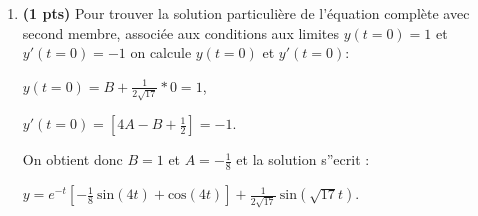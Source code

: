 \documentclass[fleqn]{article}
\begin{document}
\begin{enumerate}
{Par identification des termes en $\text{sin}(\sqrt{17} t)$ et ceux en $\text{cos}(\sqrt{17} t)$ de part et d'autre de l'\'egalit\'e, on obtient :}

\begin{center}
{$D=0$ et $C=\frac{1}{2\sqrt{17}}$.}
\end{center}

{Soit une solution particuli\`ere de l'\'equation avec second membre \'egale \`a:}

\begin{center}
{$y= \frac{1}{2\sqrt{17}}\ \text{sin}(\sqrt{17} t)$,}
\end{center}

{et une solution g\'en\'erale de l'\'equation compl\`ete avec second membre :}

\begin{center}
{$y= e^{- t} [A\  \text{sin}(4 t) + B\  \text{cos}(4 t)] + \frac{1}{2\sqrt{17}}\ \text{sin}(\sqrt{17} t)$, A et B \'etant deux r\'eels}
\end{center}
\item \textbf{(1 pts)} Pour trouver la solution particuli\`ere de l'\'equation compl\`ete avec second membre, associ\'ee aux conditions aux limites $y(t=0)=1$ et $y'(t=0)=-1$ on calcule $y(t=0)$ et $y'(t=0)$:

\begin{center}
{$y(t=0)= B+ \frac{1}{2\sqrt{17}}*0=1$, }

{$y'(t=0)= [4A - B + \frac{1}{2}]=-1$.}
\end{center}

{On obtient donc $B=1$ et $A=-\frac{1}{8}$ et la solution s''ecrit :}

\begin{center}
{$y= e^{- t} [-\frac{1}{8} \  \text{sin}(4 t) +  \text{cos}(4 t) ] + \frac{1}{2\sqrt{17}}\ \text{sin}(\sqrt{17} t)$.}
\end{center}
\end{enumerate}
\end{document}
